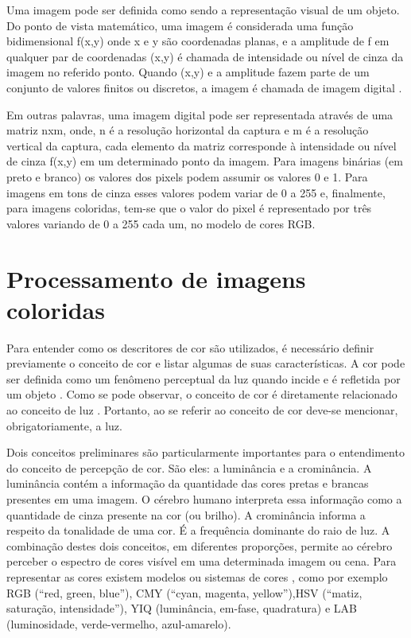Uma imagem pode ser definida como sendo a representação visual de um objeto. Do ponto de vista matemático, uma imagem é considerada uma função bidimensional f(x,y) onde x e y são coordenadas planas, e a amplitude de f em qualquer par de coordenadas (x,y) é chamada de intensidade ou nível de cinza da imagem no referido ponto. Quando (x,y) e a amplitude fazem parte de um conjunto de valores finitos ou discretos, a imagem é chamada de imagem digital \cite {Gonzalez}. 

Em outras palavras, uma imagem digital pode ser representada através de uma matriz nxm, onde, n é a resolução horizontal da captura e m é a resolução vertical da captura, cada elemento da matriz corresponde à intensidade ou nível de cinza f(x,y) em um determinado ponto da imagem. Para imagens binárias (em preto e branco) os valores dos pixels podem assumir os valores 0 e 1. Para imagens em tons de cinza esses valores podem variar de 0 a 255 e, finalmente, para imagens coloridas, tem-se que o valor do pixel é representado por três valores variando de 0 a 255 cada um, no modelo de cores RGB.


\section{Processamento de imagens coloridas}


Para entender como os descritores de cor são utilizados, é necessário definir previamente o conceito de cor e listar algumas de suas características. A cor pode ser definida como um fenômeno perceptual da luz quando incide e é refletida por um objeto \cite {Gonzalez}. Como se pode observar, o conceito de cor é diretamente relacionado ao conceito de luz \cite {Gonzalez}. Portanto, ao se referir ao conceito de cor deve-se mencionar, obrigatoriamente, a luz.

Dois conceitos preliminares são particularmente importantes para o entendimento do conceito de percepção de cor. São eles: a luminância e a crominância. A luminância contém a informação da quantidade das cores pretas e brancas presentes em uma imagem. O cérebro humano interpreta essa informação como a quantidade de cinza presente na cor (ou brilho). A crominância informa a respeito da tonalidade de uma cor. É a frequência dominante do raio de luz. A combinação destes dois conceitos, em diferentes proporções, permite ao cérebro perceber o espectro de cores visível em uma determinada imagem ou cena. Para representar as cores existem modelos ou sistemas de cores \cite {Gonzalez}, como por exemplo RGB (“red, green, blue”), CMY (“cyan, magenta, yellow”),HSV (“matiz, saturação, intensidade”), YIQ (luminância, em-fase, quadratura) e LAB (luminosidade, verde-vermelho, azul-amarelo).

